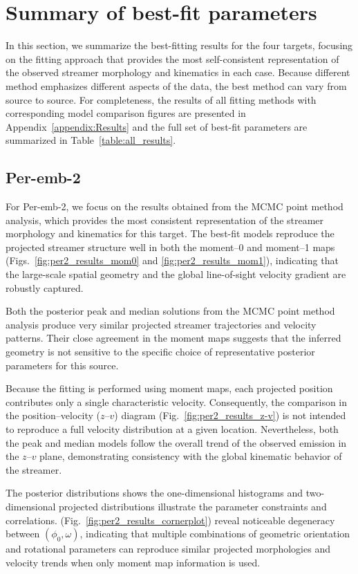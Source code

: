 \section{Summary of best-fit parameters}
In this section, we summarize the best-fitting results for the four targets, focusing on the fitting approach that provides the most self-consistent representation of the observed streamer morphology and kinematics in each case. Because different method emphasizes different aspects of the data, the best method can vary from source to source.
For completeness, the results of all fitting methods with corresponding model comparison figures are presented in Appendix~\ref{appendix:Results} and the full set of best-fit parameters are summarized in Table~\ref{table:all_results}.
\subsection{Per-emb-2}
For Per-emb-2, we focus on the results obtained from the MCMC point method analysis, which provides the most consistent representation of the streamer morphology and kinematics for this target. The best-fit models reproduce the projected streamer structure well in both the moment--0 and moment--1 maps (Figs.~\ref{fig:per2_results_mom0} and \ref{fig:per2_results_mom1}), indicating that the large-scale spatial geometry and the global line-of-sight velocity gradient are robustly captured.

Both the posterior peak and median solutions from the MCMC point method analysis produce very similar projected streamer trajectories and velocity patterns. Their close agreement in the moment maps suggests that the inferred geometry is not sensitive to the specific choice of representative posterior parameters for this source.

Because the fitting is performed using moment maps, each projected position contributes only a single characteristic velocity. Consequently, the comparison in the position--velocity ($z$--$v$) diagram (Fig.~\ref{fig:per2_results_z-v}) is not intended to reproduce a full velocity distribution at a given location. Nevertheless, both the peak and median models follow the overall trend of the observed emission in the $z$--$v$ plane, demonstrating consistency with the global kinematic behavior of the streamer.

The posterior distributions shows the one-dimensional histograms and two-dimensional projected distributions illustrate the parameter constraints and correlations. (Fig.~\ref{fig:per2_results_cornerplot}) reveal noticeable degeneracy between $(\phi_0, \omega)$, indicating that multiple combinations of geometric orientation and rotational parameters can reproduce similar projected morphologies and velocity trends when only moment map information is used.

